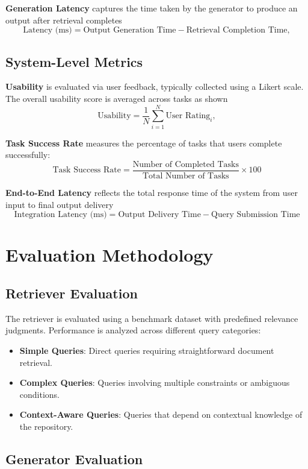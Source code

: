 \textbf{Generation Latency} captures the time taken by the generator to produce an output after retrieval completes
\[
\text{Latency (ms)} = \text{Output Generation Time} - \text{Retrieval Completion Time},
\]

\subsection{System-Level Metrics}

\textbf{Usability} is evaluated via user feedback, typically collected using a Likert scale. The overall usability score is averaged across tasks as shown
\[
\text{Usability} =
\dfrac{1}{N} \sum_{i=1}^{N} \text{User Rating}_i,
\]

\textbf{Task Success Rate} measures the percentage of tasks that users complete successfully:
\[
\text{Task Success Rate} =
\dfrac{\text{Number of Completed Tasks}}
{\text{Total Number of Tasks}} \times 100
\]

\textbf{End-to-End Latency} reflects the total response time of the system from user input to final output delivery
\[
\text{Integration Latency (ms)} =
\text{Output Delivery Time} - \text{Query Submission Time}
\]

\section{Evaluation Methodology}

\subsection{Retriever Evaluation}

The retriever is evaluated using a benchmark dataset with predefined relevance judgments. Performance is analyzed across different query categories:
\begin{itemize}
    \item \textbf{Simple Queries}: Direct queries requiring straightforward document retrieval.
    \item \textbf{Complex Queries}: Queries involving multiple constraints or ambiguous conditions.
    \item \textbf{Context-Aware Queries}: Queries that depend on contextual knowledge of the repository.
\end{itemize}

\subsection{Generator Evaluation}

